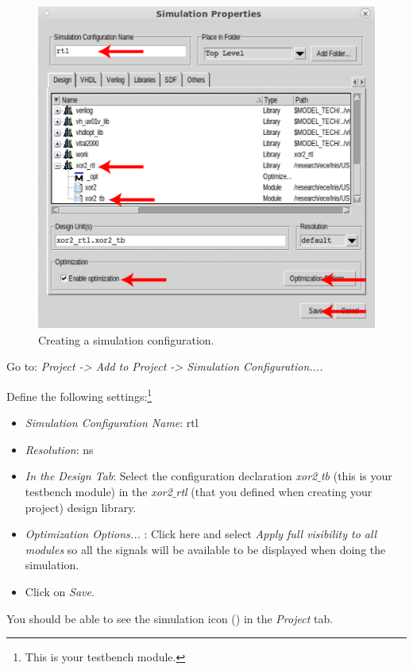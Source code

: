 \begin{enumerate}
	\parbox[t]{\dimexpr\textwidth-\leftmargin}{%
		\begin{figure}
			\vspace{0mm}
			\centering
			\vspace{-\baselineskip}
			\includegraphics[scale=0.44]{figures/modelsim/create_settings.pdf}
			\caption{Creating a simulation configuration.}
			\label{compile}
		\end{figure}
	\item Go to: \textit{Project -> Add to Project -> Simulation Configuration....}
	\item Define the following settings:\footnote{This is your testbench module.}
	\begin{itemize}
		\item \textit{Simulation Configuration Name}:  rtl
		\item \textit{Resolution}: ns
		\item \textit{In the Design Tab}: Select the configuration declaration \textit{xor2$\_$tb} (this is your testbench module) in the \textit{xor2$\_$rtl} (that you defined when creating your project) design library.
		\item \textit{Optimization Options... }: Click here and select \textit{Apply full visibility to all modules} so all the signals will be available to be displayed when doing the simulation.
		\item Click on \textit{Save}.
	\end{itemize}
	}
\item You should be able to see the simulation icon () in the \textit{Project} tab.
\end{enumerate}


